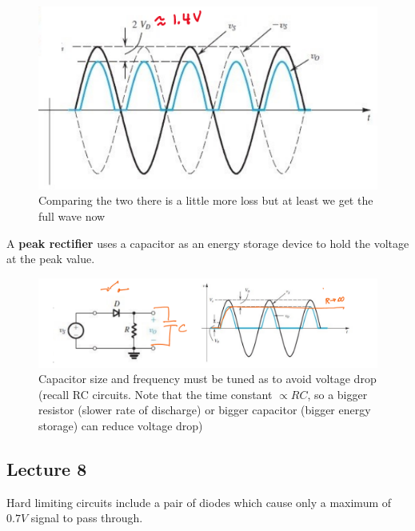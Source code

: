 \documentclass[../notes.tex]{subfiles}
\begin{document}
\begin{figure}[H]
	\centering
	\includegraphics[width=0.8\linewidth]{img/image_2022-09-23-12-52-41.png}
	\caption{Comparing the two there is a little more loss but at least we get the full wave now}
\end{figure}


A \textbf{peak rectifier} uses a capacitor as an energy storage device to hold the voltage at the peak value.

\begin{figure}[H]
	\centering
	\includegraphics[width=0.8\linewidth]{img/image_2022-09-23-12-58-46.png}
	\caption{Capacitor size and frequency must be tuned as to avoid voltage drop (recall RC circuits. Note that the time constant $ \propto RC $, so a bigger resistor (slower rate of discharge) or bigger capacitor (bigger energy storage) can reduce voltage drop)}
\end{figure}


\subsection{Lecture 8}
Hard limiting circuits include a pair of diodes which cause only a maximum of $ 0.7V $ signal to pass through.
\end{document}
